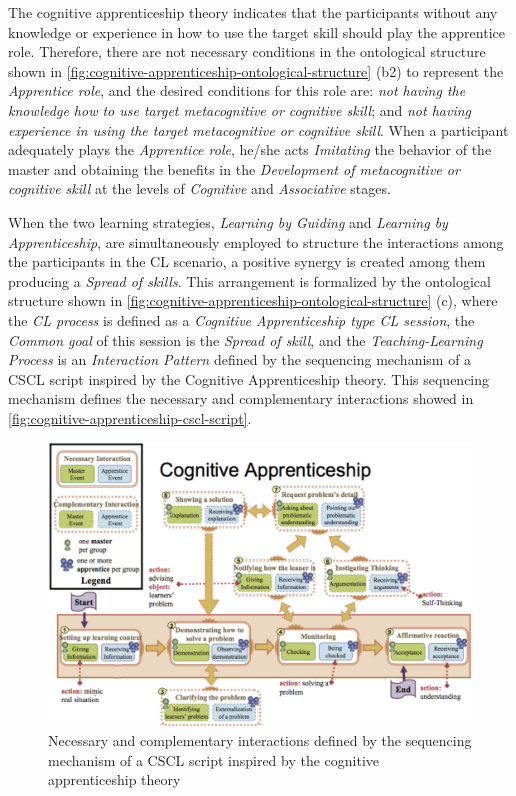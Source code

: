 The cognitive apprenticeship theory indicates that the participants without any knowledge or experience in how to use the target skill should play the apprentice role.
Therefore, there are not necessary conditions in the ontological structure shown in \autoref{fig:cognitive-apprenticeship-ontological-structure} (b2) to represent the \emph{Apprentice role}, and the desired conditions for this role are:
\emph{not having the knowledge how to use target metacognitive or cognitive skill}; and
\emph{not having experience in using the target metacognitive or cognitive skill}.
When a participant adequately plays the \emph{Apprentice role}, he/she acts \emph{Imitating} the behavior of the master and obtaining the benefits in the \emph{Development of metacognitive or cognitive skill} at the levels of \emph{Cognitive} and \emph{Associative} stages.

When the two learning strategies, \emph{Learning by Guiding} and \emph{Learning by Apprenticeship}, are simultaneously employed to structure the interactions among the participants in the CL scenario, a positive synergy is created among them producing a \emph{Spread of skills}.
This arrangement is formalized by the ontological structure shown in \autoref{fig:cognitive-apprenticeship-ontological-structure} (c), where the \emph{CL process} is defined as a \emph{Cognitive Apprenticeship type CL session}, the \emph{Common goal} of this session is the \emph{Spread of skill}, and the \emph{Teaching-Learning Process} is an \emph{Interaction Pattern} defined by the sequencing mechanism of a CSCL script inspired by the Cognitive Apprenticeship theory.
This sequencing mechanism defines the necessary and complementary interactions showed in \autoref{fig:cognitive-apprenticeship-cscl-script}. 

\begin{figure}[!htbp]
 \caption{Necessary and complementary interactions defined by the sequencing mechanism of a CSCL script inspired by the cognitive apprenticeship theory}
 \label{fig:cognitive-apprenticeship-cscl-script}
 \centering
 \includegraphics[width=1\textwidth]{images/chap-ontogacles1/cognitive-apprenticeship-cscl-script.png}
\end{figure}

